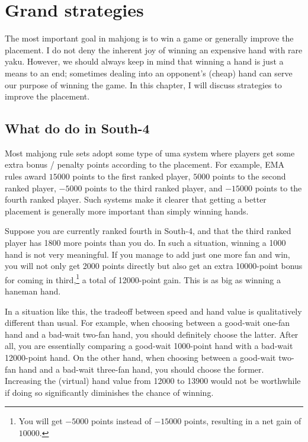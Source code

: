 
\chapter{Grand strategies} \label{ch:grand}
The most important goal in mahjong is to win a game or generally improve the placement. I do not deny the inherent joy of winning an expensive hand with rare {\jap yaku}. However, we should always keep in mind that winning a hand is just a means to an end; sometimes dealing into an opponent's (cheap) hand can serve our purpose of winning the game. 
In this chapter, I will discuss strategies to improve the placement.

\section{What do do in South-4}
Most mahjong rule sets adopt some type of {\jap uma} system where players get some extra bonus / penalty points according to the placement. For example, EMA rules award $15000$ points to the first ranked player, $5000$ points to the second ranked player, $-5000$ points to the third ranked player, and $-15000$ points to the fourth ranked player. 
Such systems make it clearer that getting a better placement is generally more important than simply winning hands. 

\bigskip
Suppose you are currently ranked fourth in South-4, and that the third ranked player has 1800 more points than you do. In such a situation, winning a 1000 hand is not very meaningful. If you manage to add just one more {\jap fan} and win, you will not only get 2000 points directly but also get an extra 10000-point bonus for coming in third,\footnote{You will get $-5000$ points instead of $-15000$ points, resulting in a net gain of $10000$.} a total of 12000-point gain. This is as big as winning a {\jap haneman} hand. 

\bigskip
In a situation like this, the tradeoff between speed and hand value is qualitatively different than usual. For example, when choosing between a good-wait one-{\jap fan} hand and a bad-wait two-{\jap fan} hand, you should definitely choose the latter. After all, you are essentially comparing a good-wait 1000-point hand with a bad-wait 12000-point hand. On the other hand, when choosing between a good-wait two-{\jap fan} hand and a bad-wait three-{\jap fan} hand, you should choose the former. Increasing the (virtual) hand value from 12000 to 13900 would not be worthwhile if doing so significantly diminishes the chance of winning. 

